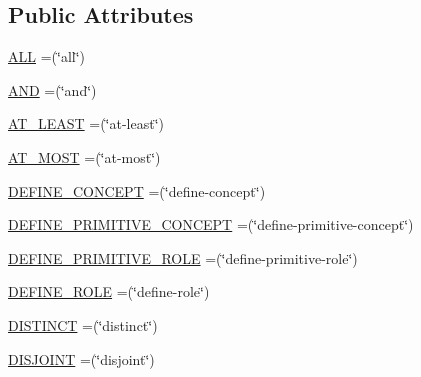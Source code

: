 \subsection*{Public Attributes}
\begin{DoxyCompactItemize}
\item 
\hyperlink{enumde_1_1uulm_1_1ecs_1_1ai_1_1owlapi_1_1krssrenderer_1_1_k_r_s_s_vocabulary_a6b47a5e37805107fc4407182a120f233}{A\-L\-L} =(\char`\"{}all\char`\"{})
\item 
\hyperlink{enumde_1_1uulm_1_1ecs_1_1ai_1_1owlapi_1_1krssrenderer_1_1_k_r_s_s_vocabulary_a1c8bb0940f6e5ca02d48364ddea10b7e}{A\-N\-D} =(\char`\"{}and\char`\"{})
\item 
\hyperlink{enumde_1_1uulm_1_1ecs_1_1ai_1_1owlapi_1_1krssrenderer_1_1_k_r_s_s_vocabulary_a4225e6e8579c8b920adbe96ec38a6944}{A\-T\-\_\-\-L\-E\-A\-S\-T} =(\char`\"{}at-\/least\char`\"{})
\item 
\hyperlink{enumde_1_1uulm_1_1ecs_1_1ai_1_1owlapi_1_1krssrenderer_1_1_k_r_s_s_vocabulary_a2f137933badc291fe41e33a39c98678f}{A\-T\-\_\-\-M\-O\-S\-T} =(\char`\"{}at-\/most\char`\"{})
\item 
\hyperlink{enumde_1_1uulm_1_1ecs_1_1ai_1_1owlapi_1_1krssrenderer_1_1_k_r_s_s_vocabulary_a75eb6a96bfd77290e4dfbcdc5b183046}{D\-E\-F\-I\-N\-E\-\_\-\-C\-O\-N\-C\-E\-P\-T} =(\char`\"{}define-\/concept\char`\"{})
\item 
\hyperlink{enumde_1_1uulm_1_1ecs_1_1ai_1_1owlapi_1_1krssrenderer_1_1_k_r_s_s_vocabulary_acdc319170e6e7f260dd58fd43c75dcfb}{D\-E\-F\-I\-N\-E\-\_\-\-P\-R\-I\-M\-I\-T\-I\-V\-E\-\_\-\-C\-O\-N\-C\-E\-P\-T} =(\char`\"{}define-\/primitive-\/concept\char`\"{})
\item 
\hyperlink{enumde_1_1uulm_1_1ecs_1_1ai_1_1owlapi_1_1krssrenderer_1_1_k_r_s_s_vocabulary_aee2f1cb7c2fc2e7542012417ff21d70c}{D\-E\-F\-I\-N\-E\-\_\-\-P\-R\-I\-M\-I\-T\-I\-V\-E\-\_\-\-R\-O\-L\-E} =(\char`\"{}define-\/primitive-\/role\char`\"{})
\item 
\hyperlink{enumde_1_1uulm_1_1ecs_1_1ai_1_1owlapi_1_1krssrenderer_1_1_k_r_s_s_vocabulary_a95f1c66989fdab6c9104f7c4d5469075}{D\-E\-F\-I\-N\-E\-\_\-\-R\-O\-L\-E} =(\char`\"{}define-\/role\char`\"{})
\item 
\hyperlink{enumde_1_1uulm_1_1ecs_1_1ai_1_1owlapi_1_1krssrenderer_1_1_k_r_s_s_vocabulary_aabfeb2c26767262947b34cccba68bba7}{D\-I\-S\-T\-I\-N\-C\-T} =(\char`\"{}distinct\char`\"{})
\item 
\hyperlink{enumde_1_1uulm_1_1ecs_1_1ai_1_1owlapi_1_1krssrenderer_1_1_k_r_s_s_vocabulary_a201d594eb7c6d1abe0527b610a002ff6}{D\-I\-S\-J\-O\-I\-N\-T} =(\char`\"{}disjoint\char`\"{})

\end{DoxyCompactItemize}
